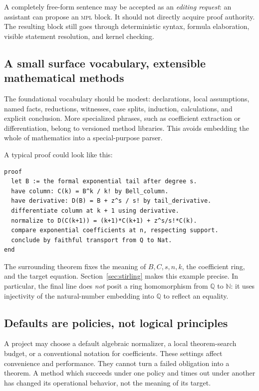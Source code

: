 \documentclass[11pt,a4paper]{article}
\newcommand{\MPL}{\textnormal{\textsc{mpl}}}
\newcommand{\N}{\mathbb N}
\newcommand{\Q}{\mathbb Q}
\theoremstyle{remark}
\begin{document}
A completely free-form sentence may be accepted as an \emph{editing request}: an assistant can propose an \MPL{} block. It should not directly acquire proof authority. The resulting block still goes through deterministic syntax, formula elaboration, visible statement resolution, and kernel checking.

\subsection{A small surface vocabulary, extensible mathematical methods}

The foundational vocabulary should be modest: declarations, local assumptions, named facts, reductions, witnesses, case splits, induction, calculations, and explicit conclusion. More specialized phrases, such as coefficient extraction or differentiation, belong to versioned method libraries. This avoids embedding the whole of mathematics into a special-purpose parser.

A typical proof could look like this:
\begin{lstlisting}[caption={Proposed syntax; method names denote specified interfaces, not existing commands.}]
proof
  let B := the formal exponential tail after degree s.
  have column: C(k) = B^k / k! by Bell_column.
  have derivative: D(B) = B + z^s / s! by tail_derivative.
  differentiate column at k + 1 using derivative.
  normalize to D(C(k+1)) = (k+1)*C(k+1) + z^s/s!*C(k).
  compare exponential coefficients at n, respecting support.
  conclude by faithful transport from Q to Nat.
end
\end{lstlisting}
The surrounding theorem fixes the meaning of $B,C,s,n,k$, the coefficient ring, and the target equation. Section~\ref{sec:stirling} makes this example precise. In particular, the final line does \emph{not} posit a ring homomorphism from $\Q$ to $\N$: it uses injectivity of the natural-number embedding into $\Q$ to reflect an equality.

\subsection{Defaults are policies, not logical principles}

A project may choose a default algebraic normalizer, a local theorem-search budget, or a conventional notation for coefficients. These settings affect convenience and performance. They cannot turn a failed obligation into a theorem. A method which succeeds under one policy and times out under another has changed its operational behavior, not the meaning of its target.
\end{document}
